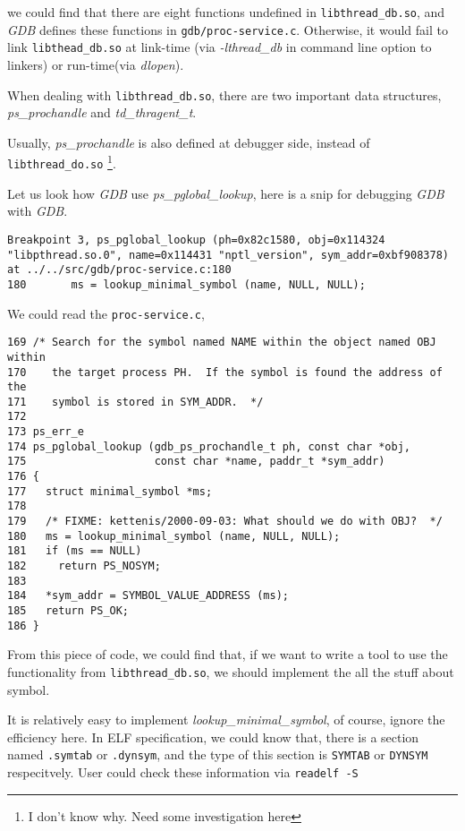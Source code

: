 we could find that there are eight functions undefined in \texttt{libthread\_db.so}, and \emph{GDB} defines these
functions in \texttt{gdb/proc-service.c}.  Otherwise, it would fail to link \texttt{libthead\_db.so} at link-time
(via \emph{-lthread\_db} in command line option to linkers) or run-time(via \emph{dlopen}).

When dealing with \texttt{libthread\_db.so}, there are two important data structures, \emph{ps\_prochandle} and 
\emph{td\_thragent\_t}.

Usually, \emph{ps\_prochandle} is also defined at debugger side, instead of \texttt{libthread\_do.so} \footnote{I don't know why.  Need some investigation here}.



Let us look how \emph{GDB} use \emph{ps\_pglobal\_lookup}, here is a snip for debugging \emph{GDB} with \emph{GDB}.
\begin{verbatim}
Breakpoint 3, ps_pglobal_lookup (ph=0x82c1580, obj=0x114324 "libpthread.so.0", name=0x114431 "nptl_version", sym_addr=0xbf908378) at ../../src/gdb/proc-service.c:180
180       ms = lookup_minimal_symbol (name, NULL, NULL);
\end{verbatim}

We could read the \texttt{proc-service.c},
\begin{verbatim}
169 /* Search for the symbol named NAME within the object named OBJ within
170    the target process PH.  If the symbol is found the address of the
171    symbol is stored in SYM_ADDR.  */
172
173 ps_err_e
174 ps_pglobal_lookup (gdb_ps_prochandle_t ph, const char *obj,
175                    const char *name, paddr_t *sym_addr)
176 {
177   struct minimal_symbol *ms;
178
179   /* FIXME: kettenis/2000-09-03: What should we do with OBJ?  */
180   ms = lookup_minimal_symbol (name, NULL, NULL);
181   if (ms == NULL)
182     return PS_NOSYM;
183
184   *sym_addr = SYMBOL_VALUE_ADDRESS (ms);
185   return PS_OK;
186 }
\end{verbatim}

From this piece of code, we could find that, if we want to write a tool to use the functionality
from \texttt{libthread\_db.so}, we should implement the all the stuff about symbol.

It is relatively easy to implement \emph{lookup\_minimal\_symbol}, of course, ignore the efficiency
here.  In ELF specification, we could know that, there is a section named \texttt{.symtab} or \texttt{.dynsym},
and the type of this section is \texttt{SYMTAB} or \texttt{DYNSYM} respecitvely.  User could check these
information via \texttt{readelf -S}

